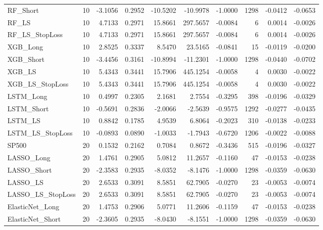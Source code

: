 \begin{tabular}{llrrrrrrrr}
\cline{1-10}
RF\_Short & 10 & -3.1056 & 0.2952 & -10.5202 & -10.9978 & -1.0000 & 1298 & -0.0412 & -0.0653 \\
\cline{1-10}
RF\_LS & 10 & 4.7133 & 0.2971 & 15.8661 & 297.5657 & -0.0084 & 6 & 0.0014 & -0.0026 \\
\cline{1-10}
RF\_LS\_StopLoss & 10 & 4.7133 & 0.2971 & 15.8661 & 297.5657 & -0.0084 & 6 & 0.0014 & -0.0026 \\
\cline{1-10}
XGB\_Long & 10 & 2.8525 & 0.3337 & 8.5470 & 23.5165 & -0.0841 & 15 & -0.0119 & -0.0200 \\
\cline{1-10}
XGB\_Short & 10 & -3.4456 & 0.3161 & -10.8994 & -11.2301 & -1.0000 & 1298 & -0.0440 & -0.0702 \\
\cline{1-10}
XGB\_LS & 10 & 5.4343 & 0.3441 & 15.7906 & 445.1254 & -0.0058 & 4 & 0.0030 & -0.0022 \\
\cline{1-10}
XGB\_LS\_StopLoss & 10 & 5.4343 & 0.3441 & 15.7906 & 445.1254 & -0.0058 & 4 & 0.0030 & -0.0022 \\
\cline{1-10}
LSTM\_Long & 10 & 0.4997 & 0.2305 & 2.1681 & 2.7554 & -0.3295 & 398 & -0.0196 & -0.0329 \\
\cline{1-10}
LSTM\_Short & 10 & -0.5691 & 0.2836 & -2.0066 & -2.5639 & -0.9575 & 1292 & -0.0277 & -0.0435 \\
\cline{1-10}
LSTM\_LS & 10 & 0.8842 & 0.1785 & 4.9539 & 6.8064 & -0.2023 & 310 & -0.0138 & -0.0233 \\
\cline{1-10}
LSTM\_LS\_StopLoss & 10 & -0.0893 & 0.0890 & -1.0033 & -1.7943 & -0.6720 & 1206 & -0.0022 & -0.0088 \\
\cline{1-10}
SP500 & 20 & 0.1532 & 0.2162 & 0.7084 & 0.8672 & -0.3436 & 515 & -0.0196 & -0.0327 \\
\cline{1-10}
LASSO\_Long & 20 & 1.4761 & 0.2905 & 5.0812 & 11.2657 & -0.1160 & 47 & -0.0153 & -0.0238 \\
\cline{1-10}
LASSO\_Short & 20 & -2.3583 & 0.2935 & -8.0352 & -8.1476 & -1.0000 & 1298 & -0.0359 & -0.0630 \\
\cline{1-10}
LASSO\_LS & 20 & 2.6533 & 0.3091 & 8.5851 & 62.7905 & -0.0270 & 23 & -0.0053 & -0.0074 \\
\cline{1-10}
LASSO\_LS\_StopLoss & 20 & 2.6533 & 0.3091 & 8.5851 & 62.7905 & -0.0270 & 23 & -0.0053 & -0.0074 \\
\cline{1-10}
ElasticNet\_Long & 20 & 1.4753 & 0.2906 & 5.0771 & 11.2606 & -0.1159 & 47 & -0.0153 & -0.0238 \\
\cline{1-10}
ElasticNet\_Short & 20 & -2.3605 & 0.2935 & -8.0430 & -8.1551 & -1.0000 & 1298 & -0.0359 & -0.0630 \\

\end{tabular}
